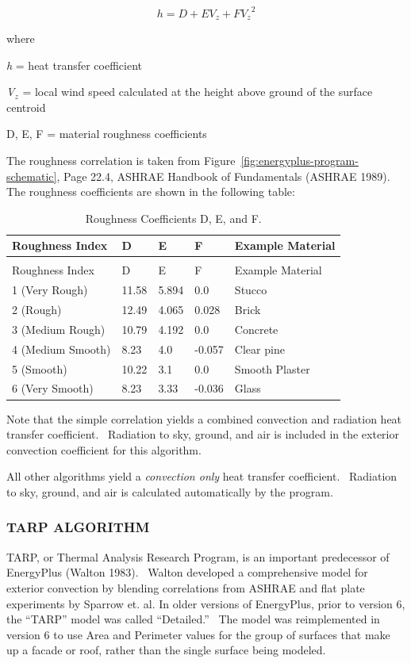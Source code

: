 \begin{equation}
h = D + E{V_z} + F{V_z}^2
\end{equation}

where

\emph{h} = heat transfer coefficient

\emph{V\(_{z}\)} = local wind speed calculated at the height above ground of the surface centroid

D, E, F = material roughness coefficients

The roughness correlation is taken from Figure~\ref{fig:energyplus-program-schematic}, Page 22.4, ASHRAE Handbook of Fundamentals (ASHRAE 1989).~ The roughness coefficients are shown in the following table:

\begin{longtable}[c]{@{}lllll@{}}
\caption{Roughness Coefficients D, E, and F. \label{table:roughness-coefficients-d-e-and-f.}} \tabularnewline
\toprule 
Roughness Index & D & E & F & Example Material \tabularnewline
\midrule
\endfirsthead

\caption[]{Roughness Coefficients D, E, and F.} \tabularnewline
\toprule 
Roughness Index & D & E & F & Example Material \tabularnewline
\midrule
\endhead

1 (Very Rough) & 11.58 & 5.894 & 0.0 & Stucco \tabularnewline
2 (Rough) & 12.49 & 4.065 & 0.028 & Brick \tabularnewline
3 (Medium Rough) & 10.79 & 4.192 & 0.0 & Concrete \tabularnewline
4 (Medium Smooth) & 8.23 & 4.0 & -0.057 & Clear pine \tabularnewline
5 (Smooth) & 10.22 & 3.1 & 0.0 & Smooth Plaster \tabularnewline
6 (Very Smooth) & 8.23 & 3.33 & -0.036 & Glass \tabularnewline
\bottomrule
\end{longtable}

Note that the simple correlation yields a combined convection and radiation heat transfer coefficient.~ Radiation to sky, ground, and air is included in the exterior convection coefficient for this algorithm.

All other algorithms yield a \emph{convection only} heat transfer coefficient.~ Radiation to sky, ground, and air is calculated automatically by the program.

\subsubsection{TARP ALGORITHM}\label{tarp-algorithm-000}

TARP, or Thermal Analysis Research Program, is an important predecessor of EnergyPlus (Walton 1983).~ Walton developed a comprehensive model for exterior convection by blending correlations from ASHRAE and flat plate experiments by Sparrow et. al. In older versions of EnergyPlus, prior to version 6, the ``TARP'' model was called ``Detailed.''~ The model was reimplemented in version 6 to use Area and Perimeter values for the group of surfaces that make up a facade or roof, rather than the single surface being modeled.

